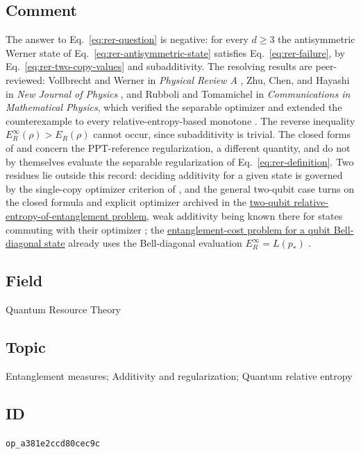 \subsection*{Comment}

The answer to Eq.~\eqref{eq:rer-question} is negative: for every $d\geq3$ the
antisymmetric Werner state of Eq.~\eqref{eq:rer-antisymmetric-state}
satisfies Eq.~\eqref{eq:rer-failure}, by Eq.~\eqref{eq:rer-two-copy-values}
and subadditivity.  The resolving results are peer-reviewed: Vollbrecht and
Werner in \emph{Physical Review A}
, Zhu, Chen, and Hayashi in
\emph{New Journal of Physics} ,
and Rubboli and Tomamichel in \emph{Communications in Mathematical Physics},
which verified the separable optimizer and extended the counterexample to
every relative-entropy-based monotone
.  The reverse inequality
$E_R^\infty(\rho)>E_R(\rho)$ cannot occur, since subadditivity is trivial.  The closed forms of
 and
 concern the PPT-reference
regularization, a different quantity, and do not by themselves evaluate the
separable regularization of Eq.~\eqref{eq:rer-definition}.
Two residues lie outside this record: deciding additivity for a given state
is governed by the single-copy optimizer criterion of
, and the general two-qubit case turns on
the closed formula and explicit optimizer archived in the \href{https://qiqc-op.com/problem/op_e2149f4ced34d1a8/}{two-qubit relative-entropy-of-entanglement problem}, weak additivity being known there
for states commuting with their optimizer
; the \href{https://qiqc-op.com/problem/op_aa21ac5ebca8b888/}{entanglement-cost problem for a qubit Bell-diagonal state} already uses the Bell-diagonal evaluation
$E_R^\infty=L(p_*)$ .

\subsection*{Field}

Quantum Resource Theory

\subsection*{Topic}

Entanglement measures; Additivity and regularization; Quantum relative entropy

\subsection*{ID}

\texttt{op\_a381e2ccd80cec9c}
